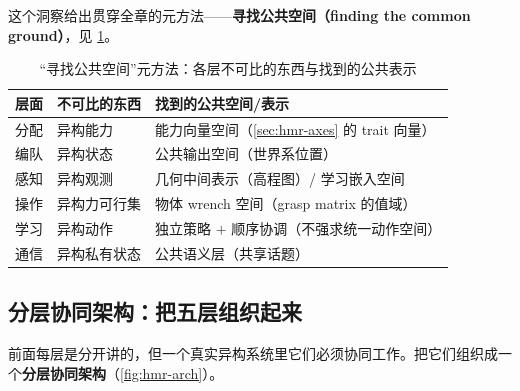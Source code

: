 \noindent 这个洞察给出贯穿全章的元方法——\textbf{寻找公共空间（finding the common ground）}，见 \cref{tab:hmr-common-ground}。

\begin{table}[H]\centering\small
\caption{“寻找公共空间”元方法：各层不可比的东西与找到的公共表示}
\label{tab:hmr-common-ground}
\begin{tabular}{lll}
\toprule
层面 & 不可比的东西 & 找到的公共空间/表示 \\
\midrule
分配 & 异构能力 & 能力向量空间（\cref{sec:hmr-axes} 的 trait 向量） \\
编队 & 异构状态 & 公共输出空间（世界系位置） \\
感知 & 异构观测 & 几何中间表示（高程图）/ 学习嵌入空间 \\
操作 & 异构力可行集 & 物体 wrench 空间（grasp matrix 的值域） \\
学习 & 异构动作 & 独立策略 $+$ 顺序协调（不强求统一动作空间） \\
通信 & 异构私有状态 & 公共语义层（共享话题） \\
\bottomrule
\end{tabular}
\end{table}

\subsection{分层协同架构：把五层组织起来}
\label{sec:hmr-bound-arch}
前面每层是分开讲的，但一个真实异构系统里它们必须协同工作。把它们组织成一个\textbf{分层协同架构}（\cref{fig:hmr-arch}）。

